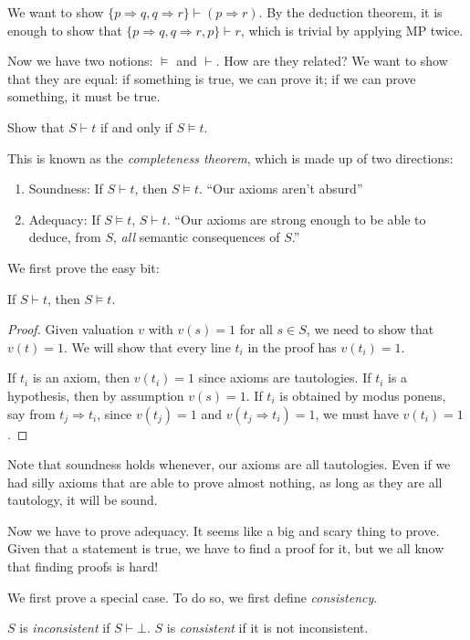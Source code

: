 \documentclass[a4paper]{article}
\begin{document}
\begin{eg}
  We want to show $\{p\Rightarrow q, q\Rightarrow r\} \vdash (p\Rightarrow r)$. By the deduction theorem, it is enough to show that $\{p\Rightarrow q, q\Rightarrow r, p\}\vdash r$, which is trivial by applying MP twice.
\end{eg}

Now we have two notions: $\models$ and $\vdash$. How are they related? We want to show that they are equal: if something is true, we can prove it; if we can prove something, it must be true.

\begin{aim}
 Show that $S\vdash t$ if and only if $S\models t$.
 \end{aim}
This is known as the \emph{completeness theorem}, which is made up of two directions:
\begin{enumerate}
  \item Soundness: If $S\vdash t$, then $S\models t$. ``Our axioms aren't absurd''
  \item Adequacy: If $S\models t$, $S\vdash t$. ``Our axioms are strong enough to be able to deduce, from $S$, \emph{all} semantic consequences of $S$.''
\end{enumerate}

We first prove the easy bit:
\begin{prop}
  If $S\vdash t$, then $S\models t$.
\end{prop}

\begin{proof}
  Given valuation $v$ with $v(s) = 1$ for all $s\in S$, we need to show that $v(t) = 1$. We will show that every line $t_i$ in the proof has $v(t_i) = 1$.

  If $t_i$ is an axiom, then $v(t_i) = 1$ since axioms are tautologies. If $t_i$ is a hypothesis, then by assumption $v(s) = 1$. If $t_i$ is obtained by modus ponens, say from $t_j \Rightarrow t_i$, since $v(t_j) = 1$ and $v(t_j \Rightarrow t_i) = 1$, we must have $v(t_i) = 1$.
\end{proof}
Note that soundness holds whenever, our axioms are all tautologies. Even if we had silly axioms that are able to prove almost nothing, as long as they are all tautology, it will be sound.

Now we have to prove adequacy. It seems like a big and scary thing to prove. Given that a statement is true, we have to find a proof for it, but we all know that finding proofs is hard!

We first prove a special case. To do so, we first define \emph{consistency}.
\begin{defi}[Consistent]
  $S$ is \emph{inconsistent} if $S\vdash \bot$. $S$ is \emph{consistent} if it is not inconsistent.
\end{defi}
\end{document}
